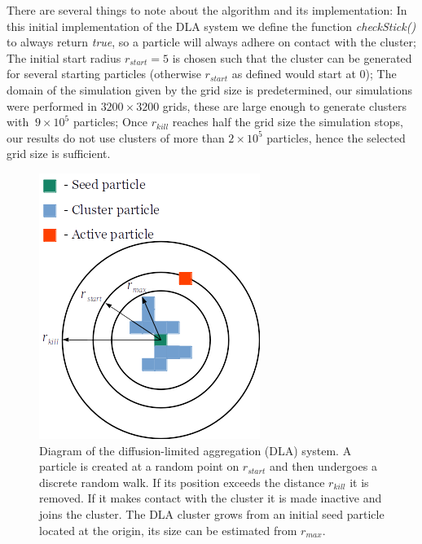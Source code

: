 \documentclass[10pt, twocolumn]{article} %
\begin{document}
  There are several things to note about the algorithm and its implementation: In this initial implementation of the DLA system we define the function \textit{checkStick()} to always return \textit{true}, so a particle will always adhere on contact with the cluster; The initial start radius $r_{start} = 5$ is chosen such that the cluster can be generated for several starting particles (otherwise $r_{start}$ as defined would start at 0); The domain of the simulation given by the grid size is predetermined, our simulations were performed in $3200 \times 3200$ grids, these are large enough to generate clusters with $~9\times10^5$ particles; Once $r_{kill}$ reaches half the grid size the simulation stops, our results do not use clusters of more than $2\times10^5$ particles, hence the selected grid size is sufficient.

\begin{figure}[t]
\centering
\includegraphics[width=0.95\columnwidth]{DLA_diagram.png}
  \caption{
    Diagram of the diffusion-limited aggregation (DLA) system. A particle is created at a random point on $r_{start}$ and then undergoes a discrete random walk. If its position exceeds the distance $r_{kill}$ it is removed. If it makes contact with the cluster it is made inactive and joins the cluster. The DLA cluster grows from an initial seed particle located at the origin, its size can be estimated from $r_{max}$.
  }
  \label{DLA_diagram}
\end{figure}
\end{document}
